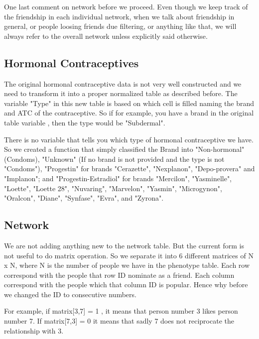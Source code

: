 				One last comment on network before we proceed. Even though we keep track of the friendship in each individual network, when we talk about friendship in general, or people loosing friends due filtering, or anything like that, we will always refer to the overall network unless explicitly said otherwise. \vspace{3 mm}
				
	
	\subsection{Hormonal Contraceptives}
	
The original hormonal contraceptive data is not very well constructed and we need to transform it into a proper normalized table as described before. The variable "Type" in this new table is based on which cell is filled naming the brand and ATC of the contraceptive. So if for example, you have a brand in the original table variable , then the type would be "Subdermal".\vspace{3 mm}
	
	There is no variable that tells you which type of hormonal contraceptive we have. So we created a function that simply classified the Brand into "Non-hormonal"(Condoms), "Unknown" (If no brand is not provided and the type is not "Condoms"), "Progestin" for brands "Cerazette", "Nexplanon", "Depo-provera" and "Implanon"; and "Progestin-Estradiol" for brands "Mercilon", "Yasminelle", "Loette", "Loette 28", "Nuvaring", "Marvelon", "Yasmin", "Microgynon", "Oralcon", "Diane", "Synfase", "Evra", and "Zyrona".\vspace{3 mm}
	
	\subsection{Network}

	We are not adding anything new to the network table. But the current form is not useful to do matrix operation. So we separate it into 6 different matrices of N x N, where N is the number of people we have in the phenotype table. Each row correspond with the people that row ID nominate as a friend. Each column correspond with the people which that column ID  is popular. Hence why before we changed the ID to consecutive numbers. \vspace{3 mm}

	For example, if matrix[3,7] = 1 , it means that person number 3 likes person number 7.  If matrix[7,3] = 0 it means that sadly 7 does not reciprocate the relationship with 3.\vspace{3 mm}


